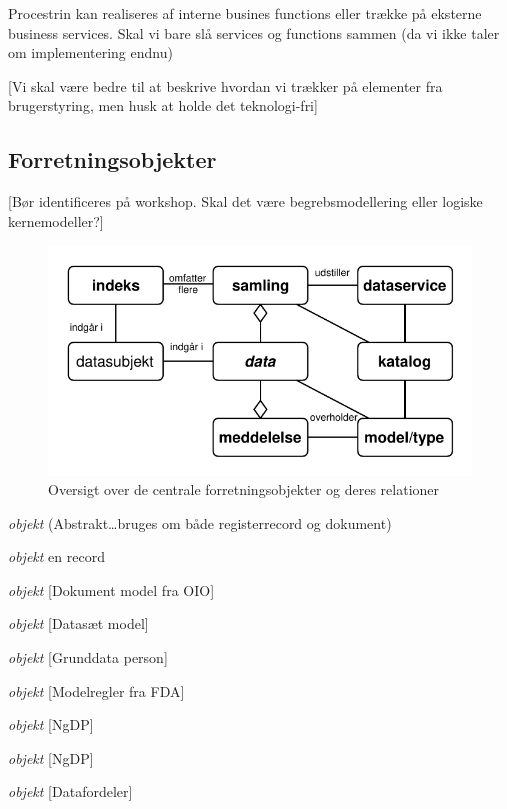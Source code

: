 Procestrin kan realiseres af interne busines functions eller trække på
eksterne business services. Skal vi bare slå services og functions
sammen (da vi ikke taler om implementering endnu)

{[}Vi skal være bedre til at beskrive hvordan vi trækker på elementer
fra brugerstyring, men husk at holde det teknologi-fri{]}

\subsection{Forretningsobjekter}\label{forretningsobjekter}

{[}Bør identificeres på workshop. Skal det være begrebsmodellering eller
logiske kernemodeller?{]}

\begin{figure}
\centering
\includegraphics{objekter.pdf}
\caption{Oversigt over de centrale forretningsobjekter og deres
relationer}
\end{figure}

\begin{description}
\tightlist
\item[Data]
\emph{objekt} (Abstrakt\ldots{}bruges om både registerrecord og
dokument)
\item[Registeroplysning]
\emph{objekt} en record
\item[Dokument]
\emph{objekt} {[}Dokument model fra OIO{]}
\item[Datasamling]
\emph{objekt} {[}Datasæt model{]}
\item[Datasubjekt]
\emph{objekt} {[}Grunddata person{]}
\item[Model/Schema]
\emph{objekt} {[}Modelregler fra FDA{]}
\item[Meddelelse]
\emph{objekt} {[}NgDP{]}
\item[Påmindelse]
\emph{objekt} {[}NgDP{]}
\item[Registreringshændelse]
\emph{objekt} {[}Datafordeler{]}
\end{description}

